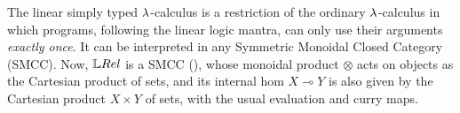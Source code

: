 The linear simply typed $\lambda$-calculus is a restriction of the ordinary $\lambda$-calculus in which programs, following the linear logic mantra, can only use their arguments \emph{exactly once}. %
It can be interpreted in any Symmetric Monoidal Closed Category (SMCC).
Now, $\LREL$ is a SMCC (\cite[Section III.A]{Manzo2013}), %
whose monoidal product $\otimes$ acts on objects as the Cartesian product of sets, %
 and its internal hom $X\multimap Y$ is also given by the Cartesian product $X\times Y$ of sets, with the usual evaluation and curry maps.

